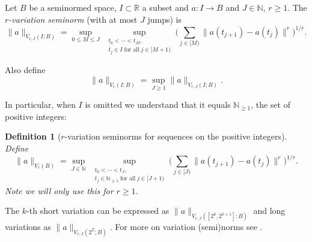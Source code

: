 \documentclass[12pt,reqno]{amsart}
\theoremstyle{plain}
\newtheorem{definition}[theorem]{Definition}
\numberwithin{equation}{section}
\theoremstyle{remark}
\newcommand{\lean}[1]{}
\begin{document}
Let $B$ be a seminormed space, $I\subset\mathbb{R}$ a subset and $a:I\to B$ and $J\in\mathbb{N}$, $r\ge 1$. The \emph{$r$-variation seminorm} (with at most $J$ jumps) is
\begin{equation}\label{auto:finite-variation-seminorm} \|a\|_{V_{r,J}(I; B)} = \sup_{0\le M\le J}\ \sup_{\substack{t_0<\cdots<t_M,\\t_j\in I\;\text{for all}\;j\in [M+1)}} \Big(\sum_{j\in[M)} \|a(t_{j+1})- a(t_{j})\|^r\Big)^{1/r}. \end{equation}

Also define
\[
\|a\|_{V_r(I; B)}=\sup_{J\ge 1} \|a\|_{V_{r,J}(I; B)}.
\]

In particular, when $I$ is omitted we understand that it equals  $\mathbb{N}_{\ge 1}$, the set of positive integers:

\begin{definition}[$r$-variation seminorms for sequences on the positive integers]\label{variation seminorm on positive integers}\lean{nCT.variationSeminorm}
Define
$$\|a\|_{V_{r}(B)} = \sup_{J\in\mathbb{N}}\ \sup_{\substack{t_0<\cdots<t_J,\\
t_j\in \mathbb{N}_{\ge 1}\;
\text{for all}\;j\in [J+1)}} \Big(\sum_{j\in[J)} \|a(t_{j+1})- a(t_{j})\|^r\Big)^{1/r}.$$
Note we will only use this for $r\ge 1$.
\end{definition}

The $k$-th short variation can be expressed as
$\|a\|_{V_{r,J}([2^k, 2^{k+1}]; B)}$
and long variations as
$\|a\|_{V_{r,J}(2^\mathbb{Z}; B)}.$
For more on variation (semi)norms see \cite{JonesSeegerWright08}.
\end{document}
